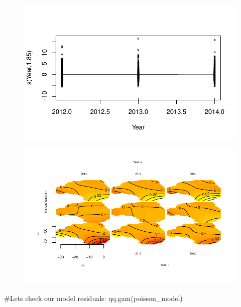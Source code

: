 \documentclass[
  letterpaper,
  DIV=11,
  numbers=noendperiod]{scrartcl}
\newenvironment{Shaded}{\begin{snugshade}}{\end{snugshade}}
\newcommand{\CommentTok}[1]{\textcolor[rgb]{0.37,0.37,0.37}{#1}}
\newcommand{\FunctionTok}[1]{\textcolor[rgb]{0.28,0.35,0.67}{#1}}
\newcommand{\NormalTok}[1]{\textcolor[rgb]{0.00,0.23,0.31}{#1}}
\begin{document}
\begin{figure}[H]

{\centering \includegraphics{Group34Coursework_files/figure-pdf/unnamed-chunk-9-11.pdf}

}

\end{figure}

\begin{figure}[H]

{\centering \includegraphics{Group34Coursework_files/figure-pdf/unnamed-chunk-9-12.pdf}

}

\end{figure}

\begin{Shaded}
\begin{Highlighting}[]
\CommentTok{\#Lets check our model residuals:}
\FunctionTok{qq.gam}\NormalTok{(poisson\_model)}
\end{Highlighting}
\end{Shaded}
\end{document}
